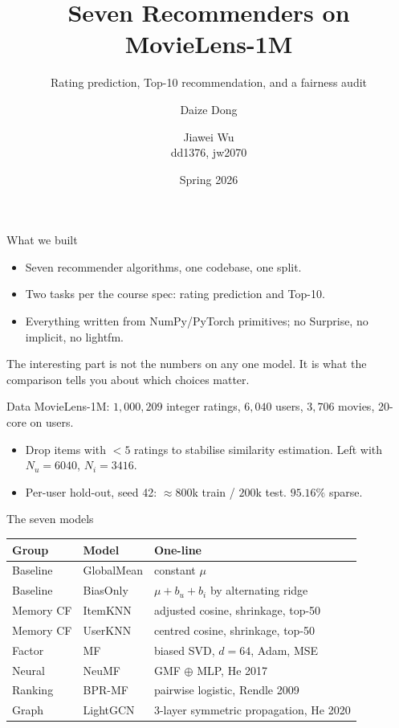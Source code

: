 \documentclass[aspectratio=169]{beamer}
\title[Seven Recommenders on ML-1M]{Seven Recommenders on MovieLens-1M}
\subtitle{Rating prediction, Top-10 recommendation, and a fairness audit}
\author[Dong, Wu]{Daize Dong \and Jiawei Wu \\
  \small dd1376, jw2070}
\institute[Rutgers]{CS 550 Massive Data Mining and Learning \\ Rutgers University}
\date{Spring 2026}
\begin{document}
\maketitle

\begin{frame}{What we built}
  \begin{itemize}
    \item Seven recommender algorithms, one codebase, one split.
    \item Two tasks per the course spec: rating prediction and Top-10.
    \item Everything written from NumPy/PyTorch primitives; no Surprise, no implicit, no lightfm.
  \end{itemize}
  \vspace{0.6em}
  The interesting part is not the numbers on any one model. It is what the comparison tells you about which choices matter.
\end{frame}

\begin{frame}{Data}
  MovieLens-1M: $1{,}000{,}209$ integer ratings, $6{,}040$ users, $3{,}706$ movies, 20-core on users.
  \begin{itemize}
    \item Drop items with $<5$ ratings to stabilise similarity estimation. Left with $N_u{=}6040$, $N_i{=}3416$.
    \item Per-user hold-out, seed 42: $\approx 800$k train / $200$k test. $95.16\%$ sparse.
  \end{itemize}
\end{frame}

\begin{frame}{The seven models}
  \small
  \begin{tabular}{lll}
    \toprule
    Group & Model & One-line \\
    \midrule
    Baseline    & GlobalMean    & constant $\mu$ \\
    Baseline    & BiasOnly      & $\mu + b_u + b_i$ by alternating ridge \\
    \midrule
    Memory CF   & ItemKNN       & adjusted cosine, shrinkage, top-50 \\
    Memory CF   & UserKNN       & centred cosine, shrinkage, top-50 \\
    \midrule
    Factor      & MF            & biased SVD, $d{=}64$, Adam, MSE \\
    Neural      & NeuMF         & GMF $\oplus$ MLP, He 2017 \\
    \midrule
    Ranking     & BPR-MF        & pairwise logistic, Rendle 2009 \\
    Graph       & LightGCN      & 3-layer symmetric propagation, He 2020 \\
    \bottomrule
  \end{tabular}
\end{frame}
\end{document}
